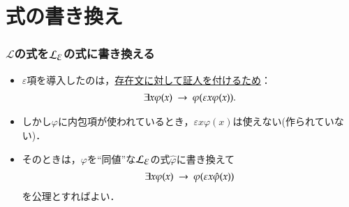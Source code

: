 \documentclass[dvipdfmx,10pt,notheorems]{beamer}
\theoremstyle{definition}
\newcommand{\lang}[1]{\mathcal{L}_{\scalebox{1.2}{$#1$}}} %
\newcommand{\rarrow}{\hspace{0.25em}\rightarrow\hspace{0.25em}} %
\begin{document}
\section{式の書き換え}
\begin{frame}\frametitle{$\mathcal{L}$の式を$\lang{\varepsilon}$の式に書き換える}
	\begin{itemize}
		\item $\varepsilon$項を導入したのは，\underline{存在文に対して証人を付けるため}：
			\begin{align}
				\exists x \varphi(x) \rarrow \varphi(\varepsilon x \varphi(x)).
			\end{align}
			
		\item しかし$\varphi$に内包項が使われているとき，$\varepsilon x \varphi(x)$は使えない(作られていない)．
		
		\item そのときは，$\varphi$を``同値''な$\lang{\varepsilon}$の式$\hat{\varphi}$に書き換えて
			\begin{align}
				\exists x \varphi(x) \rarrow \varphi(\varepsilon x \hat{\varphi}(x))
			\end{align}
			を公理とすればよい．
	\end{itemize}
\end{frame}
\end{document}
